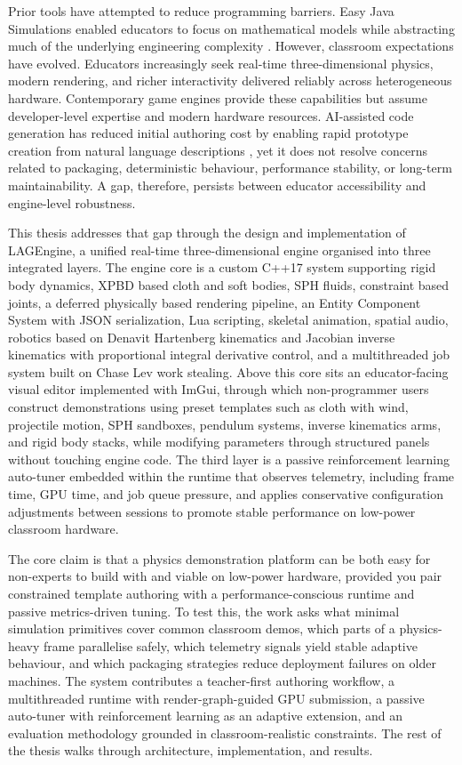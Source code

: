 \documentclass[9pt,openany]{extbook}
\begin{document}
Prior tools have attempted to reduce programming barriers. Easy Java Simulations enabled educators to focus on mathematical models while abstracting much of the underlying engineering complexity \cite{esquembre2004ejs}.  However, classroom expectations have evolved. Educators increasingly seek real-time three-dimensional physics, modern rendering, and richer interactivity delivered reliably across heterogeneous hardware. Contemporary game engines provide these capabilities but assume developer-level expertise and modern hardware resources. AI-assisted code generation has reduced initial authoring cost by enabling rapid prototype creation from natural language descriptions \cite{benzion2025ai}, yet it does not resolve concerns related to packaging, deterministic behaviour, performance stability, or long-term maintainability. A gap, therefore, persists between educator accessibility and engine-level robustness.

This thesis addresses that gap through the design and implementation of LAGEngine, a unified real-time three-dimensional engine organised into three integrated layers. The engine core is a custom C++17 system supporting rigid body dynamics, XPBD based cloth and soft bodies, SPH fluids, constraint based joints, a deferred physically based rendering pipeline, an Entity Component System with JSON serialization, Lua scripting, skeletal animation, spatial audio, robotics based on Denavit Hartenberg kinematics and Jacobian inverse kinematics with proportional integral derivative control, and a multithreaded job system built on Chase Lev work stealing. Above this core sits an educator-facing visual editor implemented with ImGui, through which non-programmer users construct demonstrations using preset templates such as cloth with wind, projectile motion, SPH sandboxes, pendulum systems, inverse kinematics arms, and rigid body stacks, while modifying parameters through structured panels without touching engine code. The third layer is a passive reinforcement learning auto-tuner embedded within the runtime that observes telemetry, including frame time, GPU time, and job queue pressure, and applies conservative configuration adjustments between sessions to promote stable performance on low-power classroom hardware.

The core claim is that a physics demonstration platform can be both easy for non-experts to build with and viable on low-power hardware, provided you pair constrained template authoring with a performance-conscious runtime and passive metrics-driven tuning. To test this, the work asks what minimal simulation primitives cover common classroom demos, which parts of a physics-heavy frame parallelise safely, which telemetry signals yield stable adaptive behaviour, and which packaging strategies reduce deployment failures on older machines. The system contributes a teacher-first authoring workflow, a multithreaded runtime with render-graph-guided GPU submission, a passive auto-tuner with reinforcement learning as an adaptive extension, and an evaluation methodology grounded in classroom-realistic constraints. The rest of the thesis walks through architecture, implementation, and results.
\end{document}
